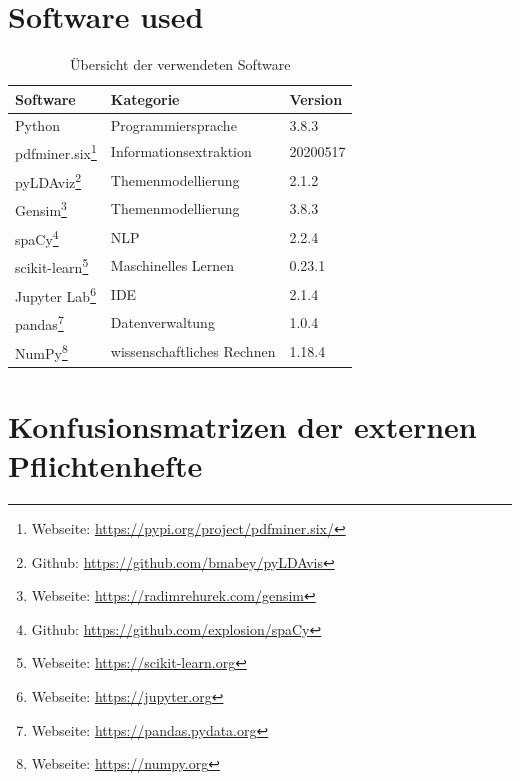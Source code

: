 \section{Software used}
\label{sec:software-used}

\vspace{3cm}

\begin{savenotes}
    \begin{table}[!ht]
    \centering
        \begin{tabular}{lll}
        \rowcolor[HTML]{FFFFFF} 
        \textbf{Software} & \textbf{Kategorie} & \textbf{Version} \\ \hline
        \rowcolor[HTML]{FFFFFF} 
        Python & Programmiersprache & 3.8.3\\
        \rowcolor[HTML]{EFEFEF} 
        pdfminer.six\footnote{Webseite: \url{https://pypi.org/project/pdfminer.six/}} & Informationsextraktion & 20200517\\
        \rowcolor[HTML]{FFFFFF}
        pyLDAviz\footnote{Github: \url{https://github.com/bmabey/pyLDAvis}} & Themenmodellierung & 2.1.2\\
        \rowcolor[HTML]{EFEFEF} 
        Gensim\footnote{Webseite: \url{https://radimrehurek.com/gensim}} & Themenmodellierung & 3.8.3\\
        \rowcolor[HTML]{FFFFFF} 
        spaCy\footnote{Github: \url{https://github.com/explosion/spaCy}} & NLP & 2.2.4\\
        \rowcolor[HTML]{EFEFEF} 
        scikit-learn\footnote{Webseite: \url{https://scikit-learn.org}} & Maschinelles Lernen & 0.23.1\\
        Jupyter Lab\footnote{Webseite: \url{https://jupyter.org}} & IDE & 2.1.4\\
        \rowcolor[HTML]{EFEFEF} 
        pandas\footnote{Webseite: \url{https://pandas.pydata.org}} & Datenverwaltung & 1.0.4\\
        \rowcolor[HTML]{FFFFFF} 
        NumPy\footnote{Webseite: \url{https://numpy.org}} & wissenschaftliches Rechnen & 1.18.4\\

        \end{tabular}%
    \caption{Übersicht der verwendeten Software}
    \label{tab:used-software}
    \end{table}
\end{savenotes}

\clearpage

\section{Konfusionsmatrizen der externen Pflichtenhefte}
\label{app:pflichtenhefte}

